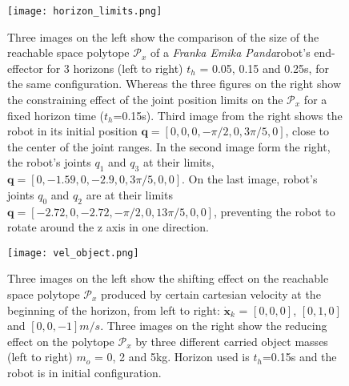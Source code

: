 \begin{figure}[!t]
    \centering
    \texttt{[image: horizon\_limits.png]}
    \caption{Three images on the left show the comparison of the size of the reachable space polytope $\mathcal{P}_x$ of a \textit{Franka Emika Panda}\protect\footnotemark robot's end-effector for 3 horizons  (left to right) $t_h$ = 0.05, 0.15 and 0.25s, for the same configuration. Whereas the three figures on the right show the constraining effect of the joint position limits on the $\mathcal{P}_x$ for a fixed horizon time ($t_h$=0.15s).
    Third image from the right shows the robot in its initial position $\bm{q}=[0,0,0,-\pi/2, 0, 3\pi/5,0]$, close to the center of the joint ranges. In the second image form the right, the robot's joints $q_1$ and $q_3$ at their limits, $\bm{q}=[0,-1.59,0,-2.9,0,3\pi/5,0,0]$. On the last image, robot's joints $q_0$ and $q_2$ are at their limits $\bm{q}=[-2.72,0, -2.72,-\pi/2,0,13\pi/5,0,0]$, preventing the robot to rotate around the z axis in one direction.} 
    \label{fig:horizon}
\end{figure}


\begin{figure}[!t]
    \centering
    \texttt{[image: vel\_object.png]}
    \caption{Three images on the left show the shifting effect on the reachable space polytope $\mathcal{P}_x$ produced by certain cartesian velocity at the beginning of the horizon, from left to right: $\dot{\bm{x}}_k$ = $[0,0,0]$, $[0,1,0] $ and $[0,0,-1]m/s$. Three images on the right show the reducing effect on the polytope $\mathcal{P}_x$ by three different carried object masses (left to right) $m_o$ = 0, 2 and 5kg. Horizon used is $t_h$=0.15s and the robot is in initial configuration.}
    \label{fig:velocity}
    \vspace{-1cm}
\end{figure}

